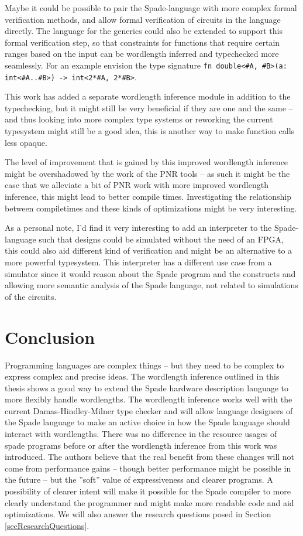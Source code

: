 Maybe it could be possible to pair the Spade-language with more complex formal verification methods, and allow formal verification of circuits in the language directly. The language for the generics could also be extended to support this formal verification step, so that constraints for functions that require certain ranges based on the input can be wordlength inferred and typechecked more seamlessly. For an example envision the type signature \verb+fn double<#A, #B>(a: int<#A..#B>) -> int<2*#A, 2*#B>+.

This work has added a separate wordlength inference module in addition to the typechecking, but it might still be very beneficial if they are one and the same -- and thus looking into more complex type systems or reworking the current typesystem might still be a good idea, this is another way to make function calls less opaque.

The level of improvement that is gained by this improved wordlength inference might be overshadowed by the work of the PNR tools -- as such it might be the case that we alleviate a bit of PNR work with more improved wordlength inference, this might lead to better compile times. Investigating the relationship between compiletimes and these kinds of optimizations might be very interesting.

As a personal note, I'd find it very interesting to add an interpreter to the Spade-language such that designs could be simulated without the need of an FPGA, this could also aid different kind of verification and might be an alternative to a more powerful typesystem. This interpreter has a different use case from a simulator since it would reason about the Spade program and the constructs and allowing more semantic analysis of the Spade language, not related to simulations of the circuits.

\chapter{Conclusion}
\label{cha:Conclusion}
Programming languages are complex things -- but they need to be complex to express complex and precise ideas. The wordlength inference outlined in this thesis shows a good way to extend the Spade hardware description language to more flexibly handle wordlengths. The wordlength inference works well with the current Damas-Hindley-Milner type checker and will allow language designers of the Spade language to make an active choice in how the Spade language should interact with wordlengths. There was no difference in the resource usages of spade programs before or after the wordlength inference from this work was introduced. The authors believe that the real benefit from these changes will not come from performance gains -- though better performance might be possible in the future -- but the ''soft'' value of expressiveness and clearer programs. A possibility of clearer intent will make it possible for the Spade compiler to more clearly understand the programmer and might make more readable code and aid optimizations. We will also answer the research questions posed in Section \ref{secResearchQuestions}.


